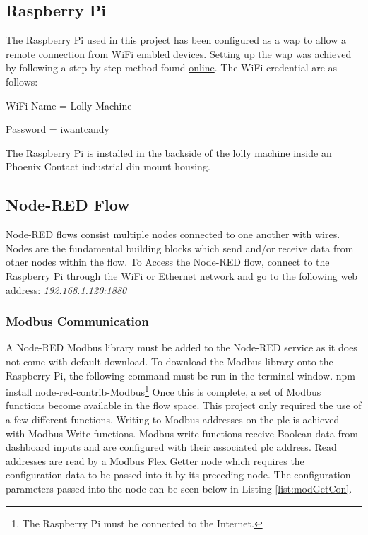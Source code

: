     \subsection{Raspberry Pi}
        The Raspberry Pi used in this project has been configured as a \acrshort{wap} to allow a remote connection from WiFi enabled devices. Setting up the \acrshort{wap} was achieved by following a step by step method found \href{https://raspberrypi-guide.github.io/networking/create-wireless-access-point}{online}\cite{wapSetup}. The WiFi credential are as follows:
        
        \begin{description}
            \item WiFi Name = Lolly Machine
            \item Password  = iwantcandy 
        \end{description}

        The Raspberry Pi is installed in the backside of the lolly machine inside an Phoenix Contact industrial din mount housing.  
              
    \subsection{Node-RED Flow}
        Node-RED flows consist multiple nodes connected to one another with wires. Nodes are the fundamental building blocks which send and/or receive data from other nodes within the flow. To Access the Node-RED flow, connect to the Raspberry Pi through the WiFi or Ethernet network and go to the following web address: \newline\textit{192.168.1.120:1880}
        \subsubsection{Modbus Communication}
            A Node-RED Modbus library must be added to the Node-RED service as it does not come with default download. To download the Modbus library onto the Raspberry Pi, the following command must be run in the terminal window. \newline npm install node-red-contrib-Modbus\footnote{The Raspberry Pi must be connected to the Internet.} \newline
            Once this is complete, a set of Modbus functions become available in the flow space. This project only required the use of a few different functions. Writing to Modbus addresses on the \acrshort{plc} is achieved with Modbus Write functions. Modbus write functions receive Boolean data from dashboard inputs and are configured with their associated \acrshort{plc} address. Read addresses are read by a Modbus Flex Getter node which requires the configuration data to be passed into it by its preceding node. The configuration parameters passed into the node can be seen below in Listing \ref{list:modGetCon}.

